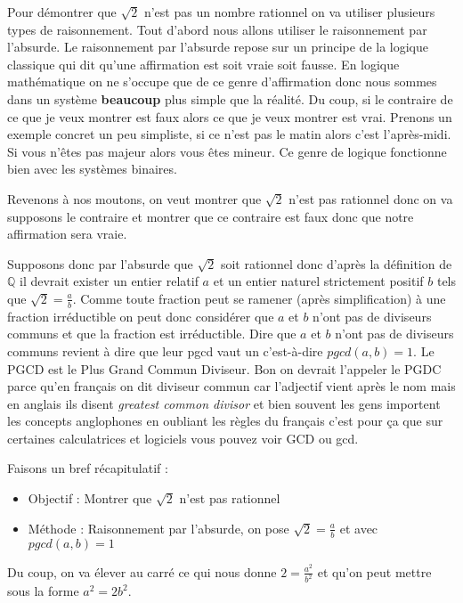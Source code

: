 \documentclass[11pt]{article}
\begin{document}
Pour démontrer que \(\sqrt{2}\) n'est pas un nombre rationnel on va
utiliser plusieurs types de raisonnement. Tout d'abord nous allons
utiliser le raisonnement par l'absurde. Le raisonnement par
l'absurde repose sur un principe de la logique classique qui dit
qu'une affirmation est soit vraie soit fausse. En logique
mathématique on ne s'occupe que de ce genre d'affirmation donc nous
sommes dans un système \textbf{beaucoup} plus simple que la réalité. Du
coup, si le contraire de ce que je veux montrer est faux alors ce
que je veux montrer est vrai. Prenons un exemple concret un peu
simpliste, si ce n'est pas le matin alors c'est l'après-midi. Si
vous n'êtes pas majeur alors vous êtes mineur. Ce genre de logique
fonctionne bien avec les systèmes binaires.

Revenons à nos moutons, on veut montrer que \(\sqrt{2}\) n'est pas
rationnel donc on va supposons le contraire et montrer que ce
contraire est faux donc que notre affirmation sera vraie.

Supposons donc par l'absurde que \(\sqrt{2}\) soit rationnel donc
d'après la définition de \(\mathbb{Q}\) il devrait exister un entier
relatif \(a\) et un entier naturel strictement positif \(b\) tels que
\(\sqrt{2} = \frac{a}{b}\). Comme toute fraction peut se ramener
(après simplification) à une fraction irréductible on peut donc
considérer que \(a\) et \(b\) n'ont pas de diviseurs communs et que la
fraction est irréductible. Dire que \(a\) et \(b\) n'ont pas de
diviseurs communs revient à dire que leur pgcd vaut un c'est-à-dire
\(pgcd(a, b) = 1\). Le PGCD est le Plus Grand Commun Diviseur. Bon on
devrait l'appeler le PGDC parce qu'en français on dit diviseur
commun car l'adjectif vient après le nom mais en anglais ils disent
\emph{greatest common divisor} et bien souvent les gens importent les
concepts anglophones en oubliant les règles du français c'est pour
ça que sur certaines calculatrices et logiciels vous pouvez voir
GCD ou gcd.

Faisons un bref récapitulatif :
\begin{itemize}
\item Objectif : Montrer que \(\sqrt{2}\) n'est pas rationnel
\item Méthode : Raisonnement par l'absurde, on pose \(\sqrt{2} =
     \frac{a}{b}\) et avec \(pgcd(a, b) = 1\)
\end{itemize}

Du coup, on va élever au carré ce qui nous donne \(2 =
   \frac{a^2}{b^2}\) et qu'on peut mettre sous la forme \(a^2 = 2b^2\).
\end{document}
